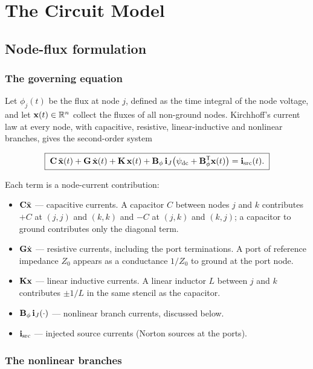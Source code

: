 \chapter{The Circuit Model}
\label{chap:circuit}

\section{Node-flux formulation}

\subsection{The governing equation}

Let $\phi_j(t)$ be the flux at node $j$, defined as the time integral of the
node voltage, and let $\mathbf{x}(t)\in\mathbb{R}^{n}$ collect the fluxes of all
non-ground nodes. Kirchhoff's current law at every node, with capacitive,
resistive, linear-inductive and nonlinear branches, gives the second-order
system

\begin{equation}
  \boxed{\;
  \mathbf{C}\,\ddot{\mathbf{x}}(t)
  + \mathbf{G}\,\dot{\mathbf{x}}(t)
  + \mathbf{K}\,\mathbf{x}(t)
  + \mathbf{B}_{\phi}\,\mathbf{i}_{J}\!\left(\psi_{\mathrm{dc}} + \mathbf{B}_{\phi}^{\mathsf T}\mathbf{x}(t)\right)
  = \mathbf{i}_{\mathrm{src}}(t).
  \;}
  \label{eq:governing}
\end{equation}

Each term is a node-current contribution:

\begin{itemize}
\item $\mathbf{C}\ddot{\mathbf{x}}$ --- capacitive currents. A capacitor $C$ between
      nodes $j$ and $k$ contributes $+C$ at $(j,j)$ and $(k,k)$ and $-C$ at
      $(j,k)$ and $(k,j)$; a capacitor to ground contributes only the diagonal
      term.
\item $\mathbf{G}\dot{\mathbf{x}}$ --- resistive currents, including the port
      terminations. A port of reference impedance $Z_0$ appears as a
      conductance $1/Z_0$ to ground at the port node.
\item $\mathbf{K}\mathbf{x}$ --- linear inductive currents. A linear inductor $L$ between
      $j$ and $k$ contributes $\pm 1/L$ in the same stencil as the capacitor.
\item $\mathbf{B}_{\phi}\,\mathbf{i}_{J}(\cdot)$ --- nonlinear branch currents, discussed below.
\item $\mathbf{i}_{\mathrm{src}}$ --- injected source currents (Norton sources at the ports).
\end{itemize}

\subsection{The nonlinear branches}
\label{sec:k-vs-branch}

